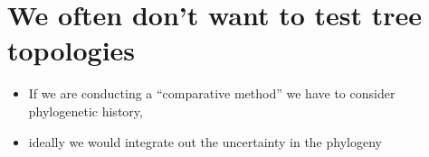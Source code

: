 
% 

\myNewSlide
\section*{We often don't want to test tree topologies}
\begin{itemize}
    \item If we are conducting a ``comparative method'' we have to consider phylogenetic history,
    \item ideally we would integrate out the uncertainty in the phylogeny
\end{itemize}
